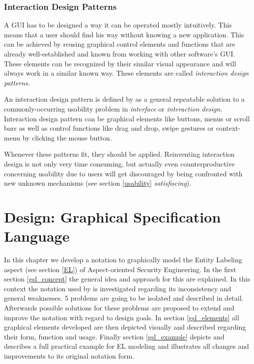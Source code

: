 \documentclass[twoside, openright, 12pt]{book}
\begin{document}
\subsection{Interaction Design Patterns}
\label{design_patterns}
A GUI has to be designed a way it can be operated mostly intuitively.
This means that a user should find his way without knowing a new application.
This can be achieved by reusing graphical control elements and functions that are already well-established and known from working with other software's GUI.
These elements can be recognized by their similar visual appearance and will always work in a similar known way.
These elements are called \textit{interaction design patterns}.

An interaction design pattern is defined by \cite{Folmer} as a general repeatable solution to a commonly-occurring usability problem in \textit{interface} or \textit{interaction design}.
Interaction design pattern can be graphical elements like buttons, menus or scroll bars as well as control functions like drag and drop, swipe gestures or context-menu by clicking the mouse button.

Whenever these patterns fit, they should be applied.
Reinventing interaction design is not only very time consuming, but actually even counterproductive concerning usability due to users will get discouraged by being confronted with new unknown mechanisms (see section \ref{usability} \textit{satisfiscing}).





\cleardoublepage
\chapter{Design: Graphical Specification Language}
\label{gsl}
In this chapter we develop a notation to graphically model the Entity Labeling aspect (see section \ref{EL}) of Aspect-oriented Security Engineering.
In the first section \ref{gsl_concept} the general idea and approach for this are explained.
In this context the notation used by \cite{Amthor18} is investigated regarding its inconsistency and general weaknesses.
5 problems are going to be isolated and described in detail.
Afterwards possible solutions for these problems are proposed to extend and improve the notation with regard to design goals.
In section \ref{gsl_elements} all graphical elements developed are then depicted visually and described regarding their form, function and usage.
Finally section \ref{gsl_example} depicts and describes a full practical example for EL modeling and illustrates all changes and improvements to its original notation form.
\end{document}
